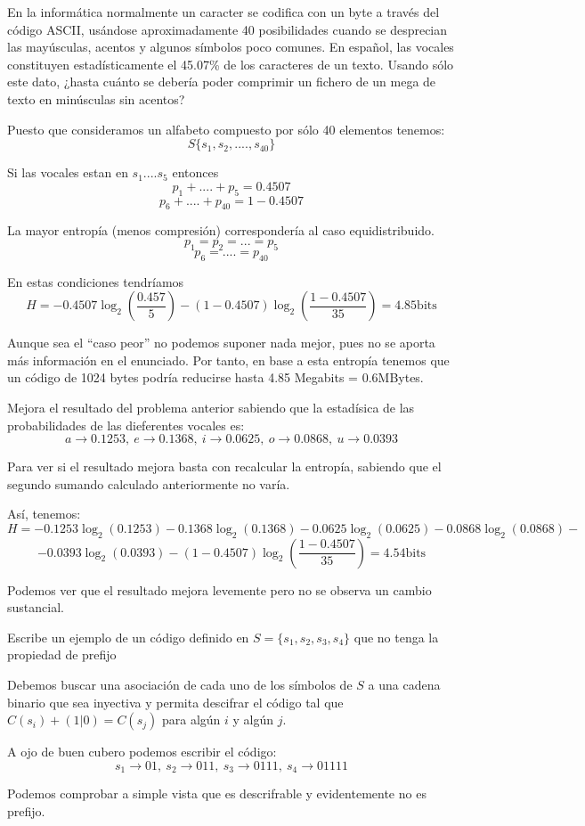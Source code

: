 \begin{problem}[6]
En la informática normalmente un caracter se codifica con un byte a través del código ASCII, usándose aproximadamente 40 posibilidades cuando se desprecian las mayúsculas, acentos y algunos símbolos poco comunes. En español, las vocales constituyen estadísticamente el 45.07\% de los caracteres de un texto. Usando sólo este dato, ¿hasta cuánto se debería poder comprimir un fichero de un mega de texto en minúsculas sin acentos?
\solution

Puesto que consideramos un alfabeto compuesto por sólo 40 elementos tenemos:
$$S \{ s_1, s_2 , ...., s_{40}\}$$

Si las vocales estan en $s_1....s_5$ entonces
$$p_1+....+p_5 = 0.4507$$
$$p_6 +....+ p_{40} = 1 - 0.4507$$

La mayor entropía (menos compresión) correspondería al caso equidistribuido.
$$p_1= p_2=...=p_5$$
$$p_6=....=p_{40}$$

En estas condiciones tendríamos
\[H= -0.4507\log_2\left(\frac{0.457}{5}\right)-(1-0.4507)\log_2\left( \frac{1-0.4507}{35}\right) = 4.85 \text{bits}\]

Aunque sea el ``caso peor'' no podemos suponer nada mejor, pues no se aporta más información en el enunciado. Por tanto, en base a esta entropía tenemos que un código de 1024 bytes podría reducirse hasta 4.85 Megabits = 0.6MBytes.
\end{problem}

\begin{problem}[7]
Mejora el resultado del problema anterior sabiendo que la estadísica de las probabilidades de las dieferentes vocales es:
\[a \to 0.1253, \ e \to 0.1368, \ i \to 0.0625, \ o \to 0.0868, \ u \to 0.0393\]
\solution

\yoP

Para ver si el resultado mejora basta con recalcular la entropía, sabiendo que el segundo sumando calculado anteriormente no varía.

Así, tenemos:
\[H= -0.1253\log_2(0.1253)-0.1368\log_2(0.1368)-0.0625\log_2(0.0625)-0.0868\log_2(0.0868)-\]
\[-0.0393\log_2(0.0393)-(1-0.4507)\log_2\left( \frac{1-0.4507}{35}\right)=4.54 \text{bits}\] %

Podemos ver que el resultado mejora levemente pero no se observa un cambio sustancial.

\end{problem}

\begin{problem}[8]
Escribe un ejemplo de un código definido en $S=\{s_1,s_2,s_3,s_4\}$ que no tenga la propiedad de prefijo
\solution

Debemos buscar una asociación de cada uno de los símbolos de $S$ a una cadena binario que sea inyectiva y permita descifrar el código tal que $C(s_i)+(1|0)=C(s_j)$ para algún $i$ y algún $j$.

A ojo de buen cubero podemos escribir el código:
\[s_1\to 01, \ s_2 \to 011, \ s_3 \to 0111, \ s_4 \to 01111\]

Podemos comprobar a simple vista que es descrifrable y evidentemente no es prefijo.

\end{problem}

